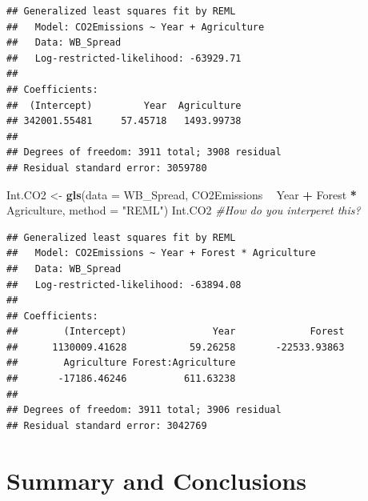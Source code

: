 \documentclass[12pt,]{article}
\newenvironment{Shaded}{\begin{snugshade}}{\end{snugshade}}
\newcommand{\KeywordTok}[1]{\textcolor[rgb]{0.13,0.29,0.53}{\textbf{#1}}}
\newcommand{\DataTypeTok}[1]{\textcolor[rgb]{0.13,0.29,0.53}{#1}}
\newcommand{\StringTok}[1]{\textcolor[rgb]{0.31,0.60,0.02}{#1}}
\newcommand{\CommentTok}[1]{\textcolor[rgb]{0.56,0.35,0.01}{\textit{#1}}}
\newcommand{\OperatorTok}[1]{\textcolor[rgb]{0.81,0.36,0.00}{\textbf{#1}}}
\newcommand{\NormalTok}[1]{#1}
\begin{document}
\begin{Shaded}
\end{Shaded}

\begin{verbatim}
## Generalized least squares fit by REML
##   Model: CO2Emissions ~ Year + Agriculture 
##   Data: WB_Spread 
##   Log-restricted-likelihood: -63929.71
## 
## Coefficients:
##  (Intercept)         Year  Agriculture 
## 342001.55481     57.45718   1493.99738 
## 
## Degrees of freedom: 3911 total; 3908 residual
## Residual standard error: 3059780
\end{verbatim}

\begin{Shaded}
\begin{Highlighting}[]
\NormalTok{Int.CO2 <-}\StringTok{ }\KeywordTok{gls}\NormalTok{(}\DataTypeTok{data =}\NormalTok{ WB_Spread,}
\NormalTok{                    CO2Emissions }\OperatorTok{~}\StringTok{ }\NormalTok{Year }\OperatorTok{+}\StringTok{ }\NormalTok{Forest }\OperatorTok{*}\StringTok{ }\NormalTok{Agriculture,}
                    \DataTypeTok{method =} \StringTok{"REML"}\NormalTok{)}
\NormalTok{Int.CO2 }\CommentTok{#How do you interperet this? }
\end{Highlighting}
\end{Shaded}

\begin{verbatim}
## Generalized least squares fit by REML
##   Model: CO2Emissions ~ Year + Forest * Agriculture 
##   Data: WB_Spread 
##   Log-restricted-likelihood: -63894.08
## 
## Coefficients:
##        (Intercept)               Year             Forest 
##      1130009.41628           59.26258       -22533.93863 
##        Agriculture Forest:Agriculture 
##       -17186.46246          611.63238 
## 
## Degrees of freedom: 3911 total; 3906 residual
## Residual standard error: 3042769
\end{verbatim}

\newpage

\section{Summary and Conclusions}\label{summary-and-conclusions}
\end{document}
